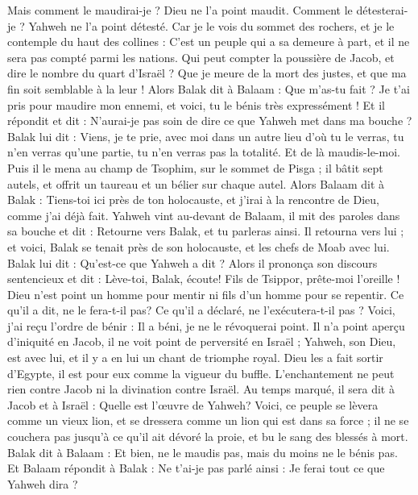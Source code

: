 \begin{multicols}{2}
Mais comment le maudirai-je ? Dieu ne l'a point maudit. Comment le détesterai-je ? Yahweh ne l'a point détesté.
Car je le vois du sommet des rochers, et je le contemple du haut des collines : C'est un peuple qui a sa demeure à part, et il ne sera pas compté parmi les nations.
Qui peut compter la poussière de Jacob, et dire le nombre du quart d'Israël ? Que je meure de la mort des justes, et que ma fin soit semblable à la leur !
Alors Balak dit à Balaam : Que m'as-tu fait ? Je t'ai pris pour maudire mon ennemi, et voici, tu le bénis très expressément !
Et il répondit et dit : N'aurai-je pas soin de dire ce que Yahweh met dans ma bouche ?
Balak lui dit : Viens, je te prie, avec moi dans un autre lieu d'où tu le verras, tu n'en verras qu'une partie, tu n'en verras pas la totalité. Et de là maudis-le-moi.
Puis il le mena au champ de Tsophim, sur le sommet de Pisga ; il bâtit sept autels, et offrit un taureau et un bélier sur chaque autel.
Alors Balaam dit à Balak : Tiens-toi ici près de ton holocauste, et j'irai à la rencontre de Dieu, comme j'ai déjà fait.
Yahweh vint au-devant de Balaam, il mit des paroles dans sa bouche et dit : Retourne vers Balak, et tu parleras ainsi.
Il retourna vers lui ; et voici, Balak se tenait près de son holocauste, et les chefs de Moab avec lui. Balak lui dit : Qu'est-ce que Yahweh a dit ?
Alors il prononça son discours sentencieux et dit : Lève-toi, Balak, écoute! Fils de Tsippor, prête-moi l'oreille !
Dieu n'est point un homme pour mentir ni fils d'un homme pour se repentir. Ce qu'il a dit, ne le fera-t-il pas? Ce qu'il a déclaré, ne l'exécutera-t-il pas ?
Voici, j'ai reçu l'ordre de bénir : Il a béni, je ne le révoquerai point.
Il n'a point aperçu d'iniquité en Jacob, il ne voit point de perversité en Israël ; Yahweh, son Dieu, est avec lui, et il y a en lui un chant de triomphe royal.
Dieu les a fait sortir d'Egypte, il est pour eux comme la vigueur du buffle.
L'enchantement ne peut rien contre Jacob ni la divination contre Israël. Au temps marqué, il sera dit à Jacob et à Israël : Quelle est l'œuvre de Yahweh?
Voici, ce peuple se lèvera comme un vieux lion, et se dressera comme un lion qui est dans sa force ; il ne se couchera pas jusqu'à ce qu'il ait dévoré la proie, et bu le sang des blessés à mort.
Balak dit à Balaam : Et bien, ne le maudis pas, mais du moins ne le bénis pas.
Et Balaam répondit à Balak : Ne t'ai-je pas parlé ainsi : Je ferai tout ce que Yahweh dira ?

\end{multicols}
